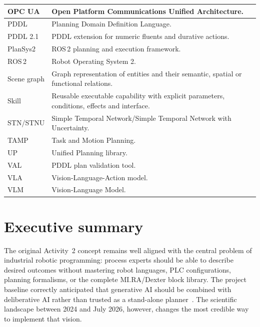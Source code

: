 \documentclass{plan4ari_report}
\begin{document}
{\begin{longtable}{|L{3.2cm}|L{12.8cm}|}
OPC UA & Open Platform Communications Unified Architecture. \\ \hline
PDDL & Planning Domain Definition Language. \\ \hline
PDDL 2.1 & PDDL extension for numeric fluents and durative actions. \\ \hline
PlanSys2 & ROS\,2 planning and execution framework. \\ \hline
ROS\,2 & Robot Operating System 2. \\ \hline
Scene graph & Graph representation of entities and their semantic, spatial or functional relations. \\ \hline
Skill & Reusable executable capability with explicit parameters, conditions, effects and interface. \\ \hline
STN/STNU & Simple Temporal Network/Simple Temporal Network with Uncertainty. \\ \hline
TAMP & Task and Motion Planning. \\ \hline
UP & Unified Planning library. \\ \hline
VAL & PDDL plan validation tool. \\ \hline
VLA & Vision-Language-Action model. \\ \hline
VLM & Vision-Language Model. \\ \hline
\end{longtable}}

\sectionsonnewpage%

\section{Executive summary}\label{sec:exec}

The original \PlanARI{} Activity~2 concept remains well aligned with the central problem of industrial robotic programming: process experts should be able to describe desired outcomes without mastering robot languages, PLC configurations, planning formalisms, or the complete MI.RA/Dexter block library. The project baseline correctly anticipated that generative AI should be combined with deliberative AI rather than trusted as a stand-alone planner~\cite{plan4ari_pd}. The scientific landscape between 2024 and July 2026, however, changes the most credible way to implement that vision.
\end{document}
